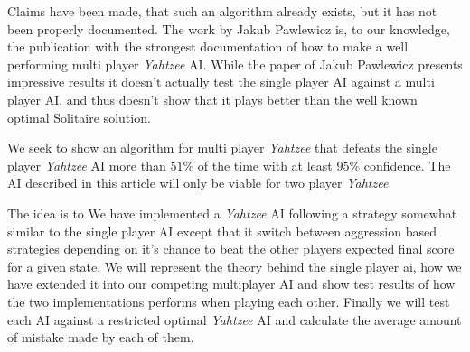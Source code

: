 Claims have been made, that such an algorithm already exists, but it has not been properly documented.
The work by Jakub Pawlewicz is, to our knowledge, the publication with the strongest documentation of how to make a well performing multi player \emph{Yahtzee} AI.
While the paper of Jakub Pawlewicz\citep{pawlewicz2011nearly} presents impressive results it doesn't actually test the single player AI against a multi player AI, and thus doesn't show that it plays better than the well known optimal Solitaire solution.

We seek to show an algorithm for multi player \emph{Yahtzee} that defeats the single player \emph{Yahtzee} AI more than $51\%$ of the time with at least $95\%$ confidence.
The AI described in this article will only be viable for two player \emph{Yahtzee}.

The idea is to %
We have implemented a \emph{Yahtzee} AI following a strategy somewhat similar to the single player AI except that it switch between aggression based strategies depending on it's chance to beat the other players expected final score for a given state. 
We will represent the theory behind the single player ai, how we have extended it into our competing multiplayer AI and show test results of how the two implementations performs when playing each other. 
Finally we will test each AI against a restricted optimal \emph{Yahtzee} AI and calculate the average amount of mistake made by each of them.

